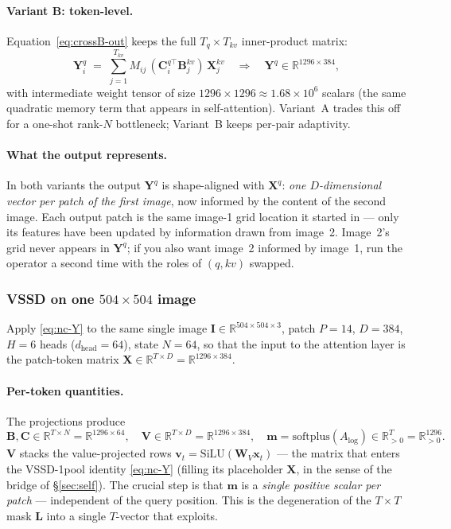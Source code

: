 \documentclass[11pt,a4paper]{article}
\begin{document}
\paragraph{Variant B: token-level.}
Equation~\eqref{eq:crossB-out} keeps the full $T_q\!\times\!T_{kv}$
inner-product matrix:
\begin{equation}
  \bm{Y}^q_{i}
   \;=\; \sum_{j=1}^{T_{kv}} M_{ij}\,(\bm{C}_i^{q\top}\bm{B}_j^{kv})\,\bm{X}_j^{kv}
   \quad\Rightarrow\quad
   \bm{Y}^q\in\mathbb{R}^{1296\times 384},
\end{equation}
with intermediate weight tensor of size
$1296\!\times\!1296\approx 1.68\!\times\!10^{6}$ scalars (the same
quadratic memory term that appears in self-attention). Variant~A
trades this off for a one-shot rank-$N$ bottleneck; Variant~B keeps
per-pair adaptivity.

\paragraph{What the output represents.}
In both variants the output $\bm{Y}^q$ is shape-aligned with
$\bm{X}^{q}$: \emph{one $D$-dimensional vector per patch of the first
image}, now informed by the content of the second image. Each
output patch is the same image-1 grid location it started in — only
its features have been updated by information drawn from image~2.
Image~2's grid never appears in $\bm{Y}^q$; if you also want
image~2 informed by image~1, run the operator a second time with the
roles of $(q, kv)$ swapped.

\subsubsection{VSSD on one \texorpdfstring{$504\!\times\!504$}{504x504} image}
\label{sec:vssd-worked}

Apply \eqref{eq:nc-Y} to the same single image
$\bm{I}\in\mathbb{R}^{504\times 504\times 3}$, patch $P=14$, $D=384$,
$H=6$ heads ($d_{\text{head}}=64$), state $N=64$, so that the input to
the attention layer is the patch-token matrix
$\bm{X}\in\mathbb{R}^{T\times D}=\mathbb{R}^{1296\times 384}$.

\paragraph{Per-token quantities.}
The projections produce
\begin{equation}
  \bm{B},\bm{C}\in\mathbb{R}^{T\times N}=\mathbb{R}^{1296\times 64},
  \quad
  \bm{V}\in\mathbb{R}^{T\times D}=\mathbb{R}^{1296\times 384},
  \quad
  \bm{m} = \mathrm{softplus}(A_{\log})\in\mathbb{R}_{>0}^{T}=\mathbb{R}_{>0}^{1296}.
\end{equation}
$\bm{V}$ stacks the value-projected rows $\bm{v}_t =
\mathrm{SiLU}(\bm{W}_V\bm{x}_t)$ — the matrix that enters the VSSD-1pool
identity \eqref{eq:nc-Y} (filling its placeholder $\bm{X}$, in the
sense of the bridge of \S\ref{sec:self}).
The crucial step is that $\bm{m}$ is a \emph{single positive scalar
per patch} — independent of the query position. This is the
degeneration of the $T\!\times\!T$ mask $\bm{L}$ into a single
$T$-vector that \cite{vssd} exploits.
\end{document}
